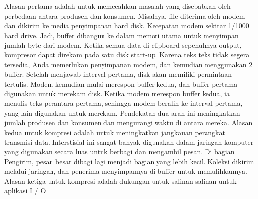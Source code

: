 Alasan pertama adalah untuk memecahkan masalah yang disebabkan oleh perbedaan antara produsen dan konsumen. Misalnya, file diterima oleh modem dan dikirim ke media penyimpanan hard disk. Kecepatan modem sekitar 1/1000 hard drive. Jadi, buffer dibangun ke dalam memori utama untuk menyimpan jumlah byte dari modem. Ketika semua data di clipboard sepenuhnya output, kompresor dapat direkam pada satu disk start-up. Karena teks teks tidak segera tersedia, Anda memerlukan penyimpanan modem, dan kemudian menggunakan 2 buffer. Setelah menjawab interval pertama, disk akan memiliki permintaan tertulis. Modem kemudian mulai merespon buffer kedua, dan buffer pertama digunakan untuk merekam disk. Ketika modem merespon buffer kedua, ia menulis teks perantara pertama, sehingga modem beralih ke interval pertama, yang lain digunakan untuk merekam. Pendekatan dua arah ini meningkatkan jumlah produsen dan konsumen dan mengurangi waktu di antara mereka. Alasan kedua untuk kompresi adalah untuk meningkatkan jangkauan perangkat transmisi data. Interstisial ini sangat banyak digunakan dalam jaringan komputer yang digunakan secara luas untuk berbagi dan mengambil pesan. Di bagian Pengirim, pesan besar dibagi lagi menjadi bagian yang lebih kecil. Koleksi dikirim melalui jaringan, dan penerima menyimpannya di buffer untuk memulihkannya. 
Alasan ketiga untuk kompresi adalah dukungan untuk salinan salinan untuk aplikasi I / O

